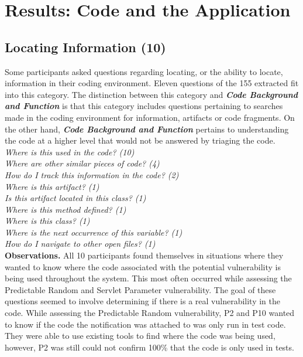 \documentclass[conference]{IEEEtran}
\begin{document}


\section{Results: Code and the Application}
\label{sec:results-ca}





\noindent\subsection{\textbf{Locating Information (10)}}\label{li}

Some participants asked questions regarding locating, or the ability to locate, information in their coding environment. 
Eleven questions of the 155 extracted fit into this category.
The distinction between this category and \emph{\textbf{Code Background and Function}} is that this category includes questions pertaining to searches made in the coding environment for information, artifacts or code fragments. 
On the other hand, \emph{\textbf{Code Background and Function}} pertains to understanding the code at a higher level that would not be answered by triaging the code.
\\

\noindent\emph{Where is this used in the code? (10)} \\
\emph{Where are other similar pieces of code? (4)} \\
\emph{How do I track this information in the code? (2)} \\
\emph{Where is this artifact? (1)} \\
\emph{Is this artifact located in this class? (1)} \\
\emph{Where is this method defined? (1)} \\
\emph{Where is this class? (1)} \\
\emph{Where is the next occurrence of this variable? (1)} \\
\emph{How do I navigate to other open files? (1)} \\


\noindent\textbf{Observations.}
All 10 participants found themselves in situations where they wanted to know where the code associated with the potential vulnerability is being used throughout the system. 
This most often occurred while assessing the Predictable Random and Servlet Parameter vulnerability. 
The goal of these questions seemed to involve determining if there is a real vulnerability in the code. 
While assessing the Predictable Random vulnerability, P2 and P10 wanted to know if the code the notification was attached to was only run in test code. 
They were able to use existing tools to find where the code was being used, however, P2 was still could not confirm 100\% that the code is only used in tests. %
\end{document}
